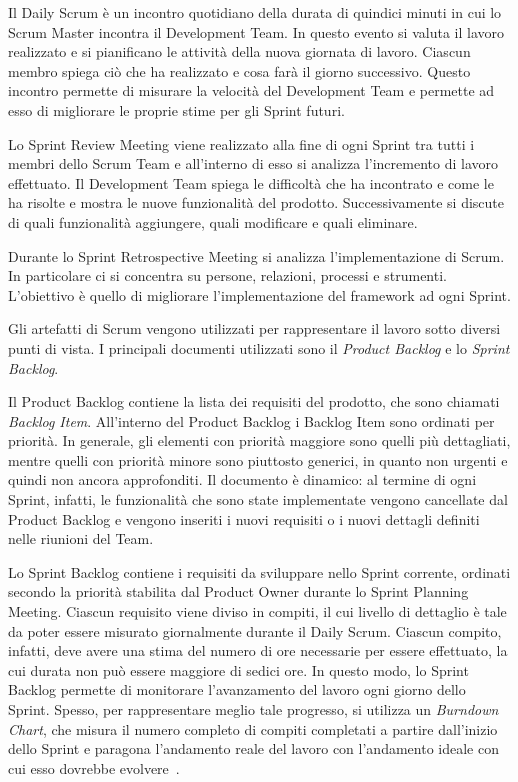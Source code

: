 			Il Daily Scrum è un incontro quotidiano della durata di quindici minuti in cui lo Scrum Master incontra il Development Team. 
			In questo evento si valuta il lavoro realizzato e si pianificano le attività della nuova giornata di lavoro.
			Ciascun membro spiega ciò che ha realizzato e cosa farà il giorno successivo.
			Questo incontro permette di misurare la velocità del Development Team e permette ad esso di migliorare le proprie stime per gli Sprint futuri.
			
			Lo Sprint Review Meeting viene realizzato alla fine di ogni Sprint tra tutti i membri dello Scrum Team e all'interno di esso si analizza l'incremento di lavoro effettuato.
			Il Development Team spiega le difficoltà che ha incontrato e come le ha risolte e mostra le nuove funzionalità del prodotto.
			Successivamente si discute di quali funzionalità aggiungere, quali modificare e quali eliminare.

			Durante lo Sprint Retrospective Meeting si analizza l'implementazione di Scrum. 
			In particolare ci si concentra su persone, relazioni, processi e strumenti.
			L'obiettivo è quello di migliorare l'implementazione del framework ad ogni Sprint.

			Gli artefatti di Scrum vengono utilizzati per rappresentare il lavoro sotto diversi punti di vista.
			I principali documenti utilizzati sono il \emph{Product Backlog} e lo \emph{Sprint Backlog}.
			
			Il Product Backlog contiene la lista dei requisiti del prodotto, che sono chiamati \emph{Backlog Item}.
			All'interno del Product Backlog i Backlog Item sono ordinati per priorità.
			In generale, gli elementi con priorità maggiore sono quelli più dettagliati, mentre quelli con priorità minore sono  piuttosto generici, in quanto non urgenti e quindi non ancora approfonditi.
			Il documento è dinamico: al termine di ogni Sprint, infatti, le funzionalità che sono state implementate vengono cancellate dal Product Backlog e vengono inseriti i nuovi requisiti o i nuovi dettagli definiti nelle riunioni del Team.

			Lo Sprint Backlog contiene i requisiti da sviluppare nello Sprint corrente, ordinati secondo la priorità stabilita dal Product Owner durante lo Sprint Planning Meeting.
			Ciascun requisito viene diviso in compiti, il cui livello di dettaglio è tale da poter essere misurato giornalmente durante il Daily Scrum.
			Ciascun compito, infatti, deve avere una stima del numero di ore necessarie per essere effettuato, la cui durata non può essere maggiore di sedici ore.
			In questo modo, lo Sprint Backlog permette di monitorare l'avanzamento del lavoro ogni giorno dello Sprint.
			Spesso, per rappresentare meglio tale progresso, si utilizza un \emph{Burndown Chart}, che misura il numero completo di compiti completati a partire dall'inizio dello Sprint e paragona l'andamento reale del lavoro con l'andamento ideale con cui esso dovrebbe evolvere~\cite{scrumEnglishGuide}.

